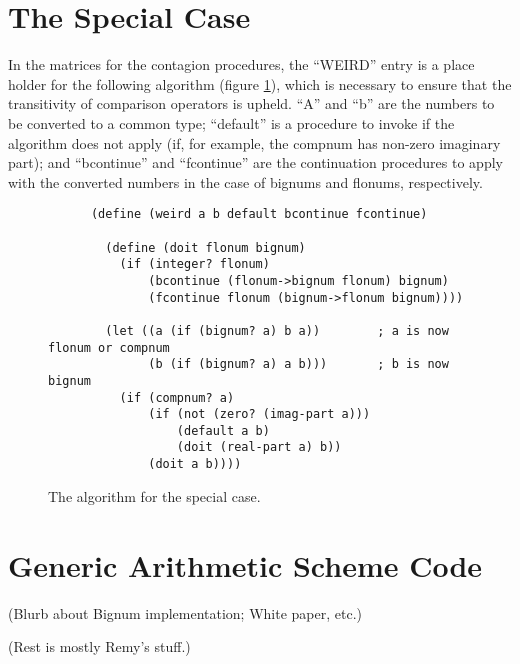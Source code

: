 \section{The Special Case}

In the matrices for the contagion procedures, the ``WEIRD'' entry is a
place holder for the following algorithm (figure \ref{weird}), which
is necessary to ensure that the transitivity of comparison operators
is upheld. ``A'' and ``b'' are the numbers to be converted to a common
type; ``default'' is a procedure to invoke if the algorithm does not
apply (if, for example, the compnum has non-zero imaginary part); and
``bcontinue'' and ``fcontinue'' are the continuation procedures to
apply with the converted numbers in the case of bignums and flonums,
respectively.

\begin{figure}[hbt]
\begin{verbatim}
      (define (weird a b default bcontinue fcontinue)

        (define (doit flonum bignum)
          (if (integer? flonum)
              (bcontinue (flonum->bignum flonum) bignum)
              (fcontinue flonum (bignum->flonum bignum))))
      
        (let ((a (if (bignum? a) b a))        ; a is now flonum or compnum
              (b (if (bignum? a) a b)))       ; b is now bignum
          (if (compnum? a)
              (if (not (zero? (imag-part a)))
                  (default a b)
                  (doit (real-part a) b))
              (doit a b))))
\end{verbatim}
\caption{The algorithm for the special case.}
\label{weird}
\end{figure}

\section{Generic Arithmetic Scheme Code}

(Blurb about Bignum implementation; White paper, etc.)

(Rest is mostly Remy's stuff.)



